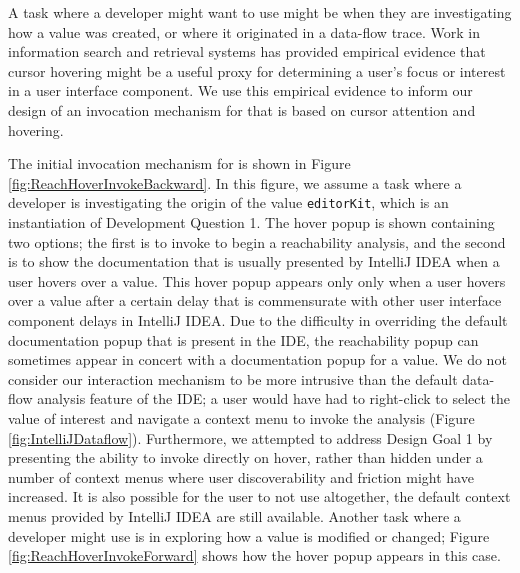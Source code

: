 \noindent A task where a developer might want to use \toolname{} might be when 
they are investigating how a value was created, or where it originated in a 
data-flow trace. 
Work in information search and retrieval systems
\cite{huang-2012-mouse,guo-2010-hover} has provided empirical evidence that cursor
hovering might be a useful proxy for determining a user's focus or interest in
a user interface component.
We use this empirical evidence to inform our design of an invocation mechanism 
for \toolname{} that is based on cursor attention and hovering.

\par The initial invocation mechanism for \toolname{} is shown in Figure 
\ref{fig:ReachHoverInvokeBackward}.
In this figure, we assume a task where a developer is investigating the origin
of the value \texttt{editorKit}, which is an instantiation of 
Development Question 1.
The hover popup is shown containing two options; the first is to invoke
\toolname{} to begin a reachability analysis, and the second is to show the
documentation that is usually presented by IntelliJ IDEA when a user hovers
over a value.
This hover popup appears only only when a user hovers over a value after a 
certain delay that is commensurate with other user interface component delays 
in IntelliJ IDEA.
Due to the difficulty in overriding the default documentation popup that is
present in the \ac{IDE}, the reachability popup can sometimes appear in concert
with a documentation popup for a value.
We do not consider our interaction mechanism to be more intrusive than the
default data-flow analysis feature of the \ac{IDE};
a user would have had to right-click to select the value of interest and
navigate a context menu to invoke the analysis (Figure
\ref{fig:IntelliJDataflow}).
Furthermore, we attempted to address Design Goal 1 by presenting the ability to 
invoke \toolname{} directly on hover, rather than hidden under a number of 
context menus where user discoverability and friction might have increased.
It is also possible for the user to not use \toolname{} altogether, the default
context menus provided by IntelliJ IDEA are still available.
Another task where a developer might use \toolname{} is in exploring how a value
is modified or changed; Figure \ref{fig:ReachHoverInvokeForward} shows how
the hover popup appears in this case.

